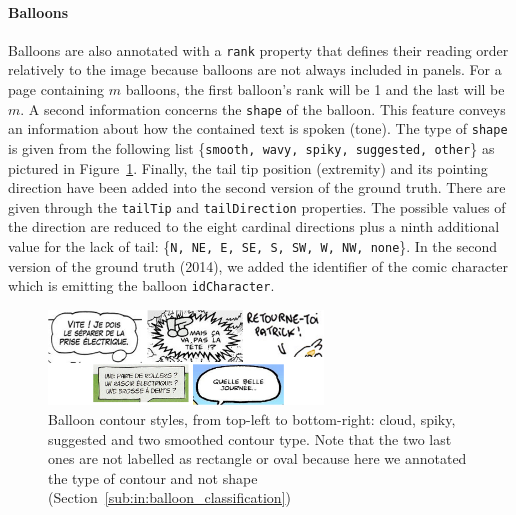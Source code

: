 \paragraph{Balloons}
Balloons are also annotated with a \texttt{{rank}} property that defines their reading order relatively to the image because balloons are not always included in panels.
For a page containing $m$ balloons, the first balloon's rank will be 1 and the last will be $m$.
A second information concerns the \texttt{{shape}} of the balloon.
This feature conveys an information about how the contained text is spoken (tone).
The type of \texttt{{shape}} is given from the following list \{\texttt{smooth, wavy, spiky, suggested, other}\} as pictured in Figure~\ref{fig:gt:balloonShape}.
Finally, the tail tip position (extremity) and its pointing direction have been added into the second version of the ground truth.
There are given through the \texttt{{tailTip}} and \texttt{{tailDirection}} properties.
The possible values of the direction are reduced to the eight cardinal directions plus a ninth additional value for the lack of tail: \{\texttt{N, NE, E, SE, S, SW, W, NW, none}\}.
In the second version of the ground truth (2014), we added the identifier of the comic character which is emitting the balloon \texttt{{idCharacter}}. 

\begin{figure}[h!]
\begin{center}
\includegraphics[width=0.65\textwidth]{balloonShape.png}
\caption[Balloon contour styles]{Balloon contour styles, from top-left to bottom-right: cloud, spiky, suggested and two smoothed contour type. Note that the two last ones are not labelled as rectangle or oval because here we annotated the type of contour and not shape (Section~\ref{sub:in:balloon_classification})}
\label{fig:gt:balloonShape}
\end{center}
\end{figure}

